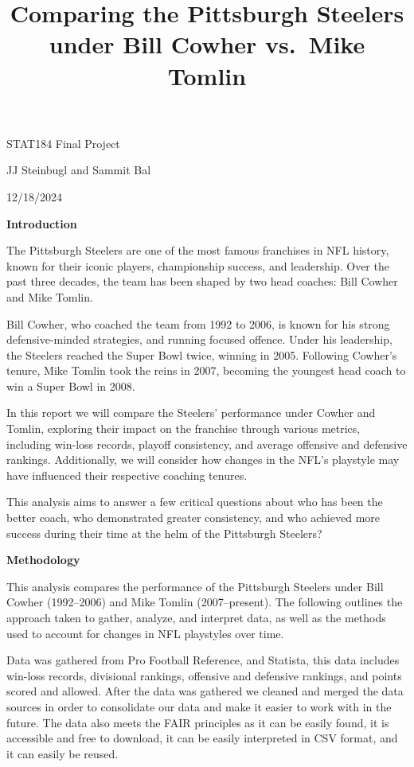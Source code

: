 \documentclass[
  letterpaper,
  DIV=11,
  numbers=noendperiod]{scrartcl}
\title{Comparing the Pittsburgh Steelers under Bill Cowher vs.~Mike
Tomlin}
\author{}
\date{}
\begin{document}
\maketitle

\begin{center}

STAT184 Final Project

JJ Steinbugl and Sammit Bal

12/18/2024

\end{center}

\textbf{Introduction}

The Pittsburgh Steelers are one of the most famous franchises in NFL
history, known for their iconic players, championship success, and
leadership. Over the past three decades, the team has been shaped by two
head coaches: Bill Cowher and Mike Tomlin.

Bill Cowher, who coached the team from 1992 to 2006, is known for his
strong defensive-minded strategies, and running focused offence. Under
his leadership, the Steelers reached the Super Bowl twice, winning in
2005. Following Cowher's tenure, Mike Tomlin took the reins in 2007,
becoming the youngest head coach to win a Super Bowl in 2008.

In this report we will compare the Steelers' performance under Cowher
and Tomlin, exploring their impact on the franchise through various
metrics, including win-loss records, playoff consistency, and average
offensive and defensive rankings. Additionally, we will consider how
changes in the NFL's playstyle may have influenced their respective
coaching tenures.

This analysis aims to answer a few critical questions about who has been
the better coach, who demonstrated greater consistency, and who achieved
more success during their time at the helm of the Pittsburgh Steelers?

\textbf{Methodology}

This analysis compares the performance of the Pittsburgh Steelers under
Bill Cowher (1992--2006) and Mike Tomlin (2007--present). The following
outlines the approach taken to gather, analyze, and interpret data, as
well as the methods used to account for changes in NFL playstyles over
time.

Data was gathered from Pro Football Reference, and Statista, this data
includes win-loss records, divisional rankings, offensive and defensive
rankings, and points scored and allowed. After the data was gathered we
cleaned and merged the data sources in order to consolidate our data and
make it easier to work with in the future. The data also meets the FAIR
principles as it can be easily found, it is accessible and free to
download, it can be easily interpreted in CSV format, and it can easily
be reused.
\end{document}
